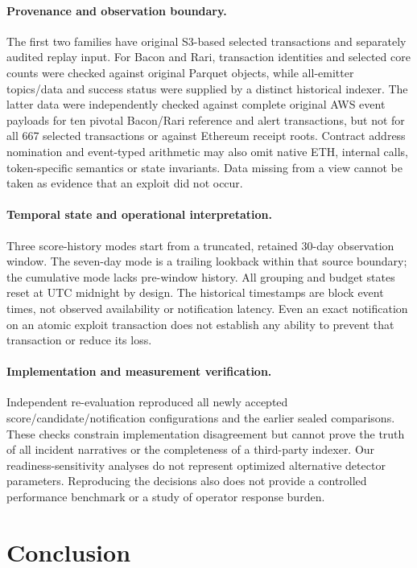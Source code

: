 \documentclass[preprint,12pt,authoryear]{elsarticle}
\begin{document}
\paragraph{Provenance and observation boundary.} The first two families have original S3-based selected transactions and separately audited replay input. For Bacon and Rari, transaction identities and selected core counts were checked against original Parquet objects, while all-emitter topics/data and success status were supplied by a distinct historical indexer. The latter data were independently checked against complete original AWS event payloads for ten pivotal Bacon/Rari reference and alert transactions, but not for all 667 selected transactions or against Ethereum receipt roots. Contract address nomination and event-typed arithmetic may also omit native ETH, internal calls, token-specific semantics or state invariants. Data missing from a view cannot be taken as evidence that an exploit did not occur.

\paragraph{Temporal state and operational interpretation.} Three score-history modes start from a truncated, retained 30-day observation window. The seven-day mode is a trailing lookback within that source boundary; the cumulative mode lacks pre-window history. All grouping and budget states reset at UTC midnight by design. The historical timestamps are block event times, not observed availability or notification latency. Even an exact notification on an atomic exploit transaction does not establish any ability to prevent that transaction or reduce its loss.

\paragraph{Implementation and measurement verification.} Independent re-evaluation reproduced all newly accepted score/candidate/notification configurations and the earlier sealed comparisons. These checks constrain implementation disagreement but cannot prove the truth of all incident narratives or the completeness of a third-party indexer. Our readiness-sensitivity analyses do not represent optimized alternative detector parameters. Reproducing the decisions also does not provide a controlled performance benchmark or a study of operator response burden.

\section{Conclusion}\label{sec:conclusion}
\end{document}
